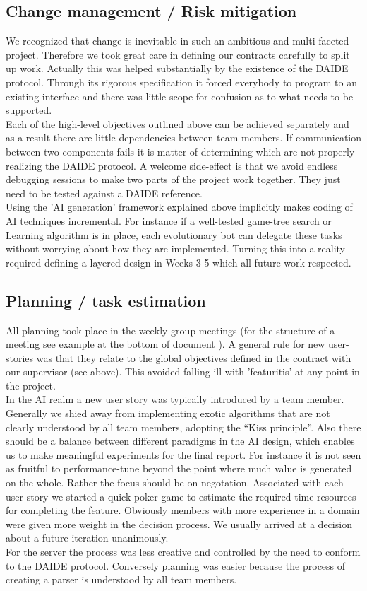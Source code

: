 \documentclass[pdftex,12pt,a4paper]{report}
\begin{document}
\subsection{Change management / Risk mitigation}
We recognized that change is inevitable in such an ambitious and
multi-faceted project. Therefore we took great care in defining our
contracts carefully to split up work. Actually this was helped
substantially by the existence of the DAIDE protocol. Through its
rigorous specification it forced everybody to program to an existing
interface and there was little scope for confusion as to what needs to
be supported.  \\ Each of the high-level objectives outlined above can
be achieved separately and as a result there are little dependencies
between team members.  If communication between two components fails
it is matter of determining which are not properly realizing the DAIDE
protocol. A welcome side-effect is that we avoid endless debugging
sessions to make two parts of the project work together. They just
need to be tested against a DAIDE reference.  \\ Using the 'AI
generation' framework explained above implicitly makes coding of AI
techniques incremental. For instance if a well-tested game-tree search
or Learning algorithm is in place, each evolutionary bot can delegate
these tasks without worrying about how they are implemented. Turning
this into a reality required defining a layered design in Weeks 3-5
which all future work respected.  \\

\subsection{Planning / task estimation}
All planning took place in the weekly group meetings (for the
structure of a meeting see example at the bottom of document ). A
general rule for new user-stories was that they relate to the global
objectives defined in the contract with our supervisor (see
above). This avoided falling ill with 'featuritis' at any point in the
project.  \\ In the AI realm a new user story was typically introduced
by a team member. Generally we shied away from implementing exotic
algorithms that are not clearly understood by all team members,
adopting the ``Kiss principle''. Also there should be a balance
between different paradigms in the AI design, which enables us to make
meaningful experiments for the final report. For instance it is not
seen as fruitful to performance-tune beyond the point where much value
is generated on the whole. Rather the focus should be on
negotation. Associated with each user story we started a quick poker
game to estimate the required time-resources for completing the
feature. Obviously members with more experience in a domain were given
more weight in the decision process.  We usually arrived at a decision
about a future iteration unanimously.  \\ For the server the process
was less creative and controlled by the need to conform to the DAIDE
protocol. Conversely planning was easier because the process of
creating a parser is understood by all team members.
\end{document}
